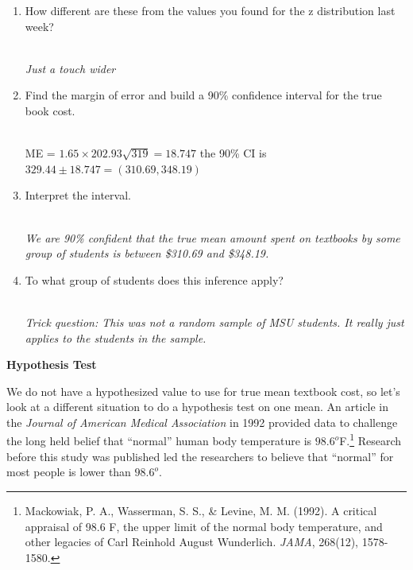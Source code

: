\begin{enumerate}
 \item 
   How different are these from the values you found for the z
   distribution last week?
\begin{students}
  \vspace{1cm}
\end{students}
\begin{key}
\\ {\it Just a touch wider}
\end{key}
\item Find the margin of error and build a 90\% confidence interval
  for the true book cost.   
\begin{students}
  \vspace{1cm}
\end{students}
\begin{key}
\\ ME = $ 1.65 \times 202.93\sqrt{319} =18.747$ the 90\% CI is $
329.44 \pm 18.747 = (310.69, 348.19)$
\end{key}
\item Interpret the interval. 
\begin{students}
  \vspace{1cm}
\end{students}
\begin{key}
\\ {\it We are 90\% confident that the true mean amount spent on
  textbooks by some group of students is between \$310.69 and \$348.19.}
\end{key}
\item To what group of students does this inference apply? 
\begin{students}
  \vspace{1cm}
\end{students}
\begin{key}
\\ {\it Trick question: This was not a random sample of MSU
  students. It really just applies to the students in the sample.}
\end{key}

\end{enumerate}


\begin{center}
  {\large\bf Hypothesis Test}
\end{center}
We do not have a hypothesized value to use for true mean textbook
cost, so let's look at a different situation to do a hypothesis test
on one mean.  An article in the {\it Journal of American Medical
  Association} in 1992 provided data to challenge the long held belief
that ``normal'' human body temperature is $98.6^o$F.\footnote{
Mackowiak, P. A., Wasserman, S. S., \& Levine, M. M. (1992). A
critical appraisal of 98.6 F, the upper limit of the normal body
temperature, and other legacies of Carl Reinhold August
Wunderlich. {\it JAMA}, 268(12), 1578-1580.}  Research before this study was
published led the researchers to believe that ``normal'' for most
people is lower than $98.6^o$.


